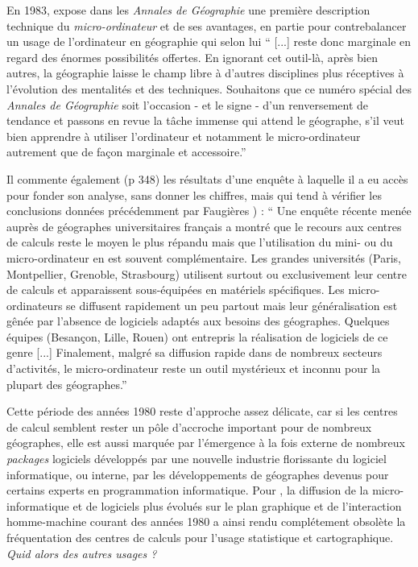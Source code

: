En 1983, \textcite[367]{Lecarpentier1983} expose dans les \textit{Annales de Géographie} une première description technique du \textit{micro-ordinateur} et de ses avantages, en partie pour contrebalancer un usage de l'ordinateur en géographie qui selon lui \enquote{ [...] reste donc marginale en regard des énormes possibilités offertes. En ignorant cet outil-là, après bien autres, la géographie laisse le champ libre à d'autres disciplines plus réceptives à l'évolution des mentalités et des techniques. Souhaitons que ce numéro spécial des \textit{Annales de Géographie} soit l'occasion - et le signe - d'un renversement de tendance et passons en revue la tâche immense qui attend le géographe, s'il veut bien apprendre à utiliser l'ordinateur et notamment le micro-ordinateur autrement que de façon marginale et accessoire.}

Il commente également (p 348) les résultats d'une enquête à laquelle il a eu accès pour fonder son analyse, sans donner les chiffres, mais qui tend à vérifier les conclusions données précédemment par Faugières ) : \enquote{ Une enquête récente menée auprès de géographes universitaires français a montré que le recours aux centres de calculs reste le moyen le plus répandu mais que l'utilisation du mini- ou du micro-ordinateur en est souvent complémentaire. Les grandes universités (Paris, Montpellier,  Grenoble, Strasbourg) utilisent surtout ou exclusivement leur centre de calculs et apparaissent sous-équipées en matériels spécifiques. Les micro-ordinateurs se diffusent rapidement un peu partout mais leur généralisation est gênée par l'absence de logiciels adaptés aux besoins des géographes. Quelques équipes (Besançon, Lille, Rouen) ont entrepris la réalisation de logiciels de ce genre [...] Finalement, malgré sa diffusion rapide dans de nombreux secteurs d'activités, le micro-ordinateur reste un outil mystérieux et inconnu pour la plupart des géographes.}

Cette période des années 1980 reste d'approche assez délicate, car si les centres de calcul semblent rester un pôle d'accroche important pour de nombreux géographes, elle est aussi marquée par l’émergence à la fois externe de nombreux \textit{packages} logiciels développés par une nouvelle industrie florissante du logiciel informatique, ou interne, par les développements de géographes devenus pour certains experts en programmation informatique. Pour \autocites[444]{Joliveau2004}{Waniez2010}, la diffusion de la micro-informatique et de logiciels plus évolués sur le plan graphique et de l’interaction homme-machine courant des années 1980 a ainsi rendu complétement obsolète la fréquentation des centres de calculs pour l’usage statistique et cartographique. \textit{Quid alors des autres usages ?}

